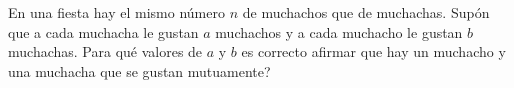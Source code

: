En una fiesta hay el mismo número $n$ de muchachos que de muchachas. Supón que a cada muchacha le gustan $a$ muchachos y a cada muchacho le gustan $b$ muchachas. Para qué valores de $a$ y $b$ es correcto afirmar que hay un muchacho y una muchacha que se gustan mutuamente?
